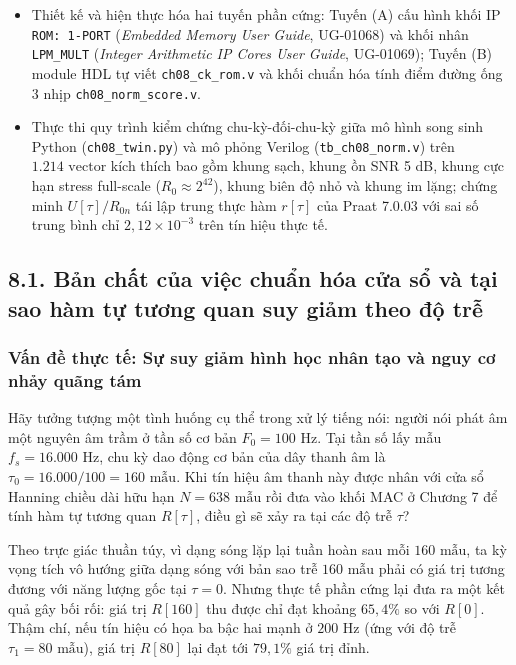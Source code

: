 \begin{learningobj}
\begin{itemize}[leftmargin=1.5em, itemsep=2pt]
    \item Thiết kế và hiện thực hóa hai tuyến phần cứng: Tuyến (A) cấu hình khối IP \texttt{ROM: 1-PORT} (\emph{Embedded Memory User Guide}, UG-01068) và khối nhân \texttt{LPM\_MULT} (\emph{Integer Arithmetic IP Cores User Guide}, UG-01069); Tuyến (B) module HDL tự viết \texttt{ch08\_ck\_rom.v} và khối chuẩn hóa tính điểm đường ống 3 nhịp \texttt{ch08\_norm\_score.v}.
    \item Thực thi quy trình kiểm chứng chu-kỳ-đối-chu-kỳ giữa mô hình song sinh Python (\texttt{ch08\_twin.py}) và mô phỏng Verilog (\texttt{tb\_ch08\_norm.v}) trên $1.214\text{ vector}$ kích thích bao gồm khung sạch, khung ồn SNR 5 dB, khung cực hạn stress full-scale ($R_0 \approx 2^{42}$), khung biên độ nhỏ và khung im lặng; chứng minh $U[\tau] / R_{0n}$ tái lập trung thực hàm $r[\tau]$ của Praat 7.0.03 với sai số trung bình chỉ $2{,}12 \times 10^{-3}$ trên tín hiệu thực tế.
\end{itemize}
\end{learningobj}

\subsection*{8.1. Bản chất của việc chuẩn hóa cửa sổ và tại sao hàm tự tương quan suy giảm theo độ trễ}

\subsubsection*{Vấn đề thực tế: Sự suy giảm hình học nhân tạo và nguy cơ nhảy quãng tám}
Hãy tưởng tượng một tình huống cụ thể trong xử lý tiếng nói: người nói phát âm một nguyên âm trầm ở tần số cơ bản $F_0 = 100\text{ Hz}$. Tại tần số lấy mẫu $f_s = 16.000\text{ Hz}$, chu kỳ dao động cơ bản của dây thanh âm là $\tau_0 = 16.000 / 100 = 160\text{ mẫu}$. Khi tín hiệu âm thanh này được nhân với cửa sổ Hanning chiều dài hữu hạn $N = 638\text{ mẫu}$ rồi đưa vào khối MAC ở Chương 7 để tính hàm tự tương quan $R[\tau]$, điều gì sẽ xảy ra tại các độ trễ $\tau$?

Theo trực giác thuần túy, vì dạng sóng lặp lại tuần hoàn sau mỗi $160\text{ mẫu}$, ta kỳ vọng tích vô hướng giữa dạng sóng với bản sao trễ $160\text{ mẫu}$ phải có giá trị tương đương với năng lượng gốc tại $\tau = 0$. Nhưng thực tế phần cứng lại đưa ra một kết quả gây bối rối: giá trị $R[160]$ thu được chỉ đạt khoảng $65{,}4\%$ so với $R[0]$. Thậm chí, nếu tín hiệu có họa ba bậc hai mạnh ở $200\text{ Hz}$ (ứng với độ trễ $\tau_1 = 80\text{ mẫu}$), giá trị $R[80]$ lại đạt tới $79{,}1\%$ giá trị đỉnh. 

